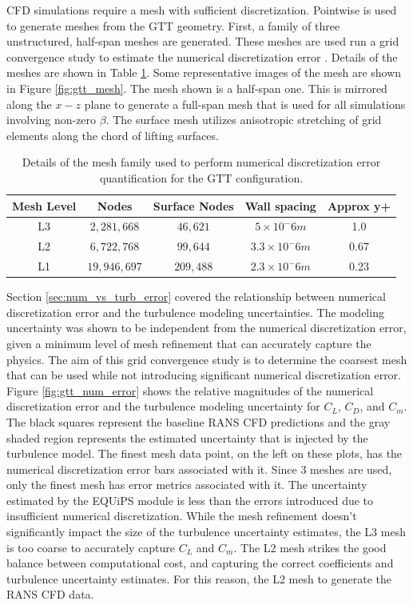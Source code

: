 CFD simulations require a mesh with sufficient discretization.
Pointwise is used to generate meshes from the GTT geometry. 
First, a family of three unstructured, half-span meshes are generated.
These meshes are used run a grid convergence study to estimate the numerical discretization error \cite{american_society_of_mechanical_engineers_standard_2009}. 
Details of the meshes are shown in Table \ref{tab:gtt_meshes}.
Some representative images of the mesh are shown in Figure \ref{fig:gtt_mesh}.
The mesh shown is a half-span one.
This is mirrored along the $x-z$ plane to generate a full-span mesh that is used for all simulations involving non-zero $\beta$.
The surface mesh utilizes anisotropic stretching of grid elements along the chord of lifting surfaces. 

\begin{table}
    \renewcommand{\arraystretch}{1.2}
    \centering
    \begin{tabular}{ c|c|c|c|c } 
         Mesh Level & Nodes & Surface Nodes & Wall spacing & Approx y+  \\ 
         \hline
         L3 & $2,281,668$ & $46,621$ & $5\times10^-6 m$ & 1.0 \\
         L2 & $6,722,768$ & $99,644$ & $3.3\times10^-6 m$ & 0.67 \\
         L1 & $19,946,697$ & $209,488$ & $2.3\times10^-6 m$ & 0.23 \\
         
    \end{tabular}
    \caption{Details of the mesh family used to perform numerical discretization error quantification for the GTT configuration.}
    \label{tab:gtt_meshes}
\end{table}

Section \ref{sec:num_vs_turb_error} covered the relationship between numerical discretization error and the turbulence modeling uncertainties. 
The modeling uncertainty was shown to be independent from the numerical discretization error, given a minimum level of mesh refinement that can accurately capture the physics. 
The aim of this grid convergence study is to determine the coarsest mesh that can be used while not introducing significant numerical discretization error. 
Figure \ref{fig:gtt_num_error} shows the relative magnitudes of the numerical discretization error and the turbulence modeling uncertainty for $C_L$, $C_D$, and $C_m$. 
The black squares represent the baseline RANS CFD predictions and the gray shaded region represents the estimated uncertainty that is injected by the turbulence model. 
The finest mesh data point, on the left on these plots, has the numerical discretization error bars associated with it. 
Since 3 meshes are used, only the finest mesh has error metrics associated with it. 
The uncertainty estimated by the EQUiPS module is less than the errors introduced due to insufficient numerical discretization.
While the mesh refinement doesn't significantly impact the size of the turbulence uncertainty estimates, the L3 mesh is too coarse to accurately capture $C_L$ and $C_m$. 
The L2 mesh strikes the good balance between computational cost, and capturing the correct coefficients and turbulence uncertainty estimates.  
For this reason, the L2 mesh to generate the RANS CFD data. 

